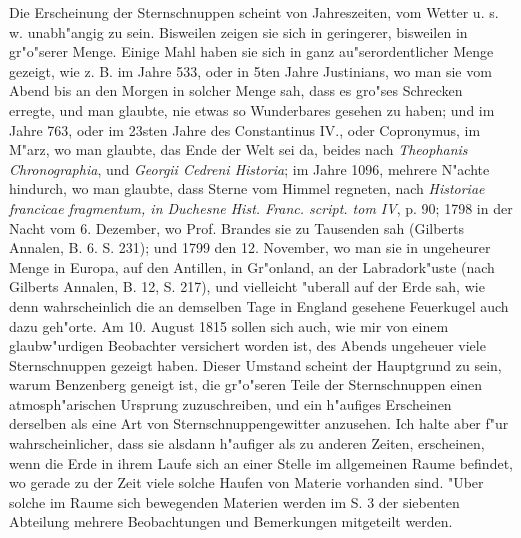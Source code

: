 \documentclass[a4paper, 11pt, oneside, polutonikogreek, german]{article}
\begin{document}
Die Erscheinung der Sternschnuppen scheint von Jahreszeiten, vom Wetter u. s. w. unabh"angig zu sein. Bisweilen zeigen sie sich in geringerer, bisweilen in gr"o"serer Menge. Einige Mahl haben sie sich in ganz au"serordentlicher Menge gezeigt, wie z. B. im Jahre 533, oder in 5ten Jahre Justinians, wo man sie vom Abend bis an den Morgen in solcher Menge sah, dass es gro"ses Schrecken erregte, und man glaubte, nie etwas so Wunderbares gesehen zu haben; und im Jahre 763, oder im 23sten Jahre des Constantinus IV., oder Copronymus, im M"arz, wo man glaubte, das Ende der Welt sei da, beides nach \emph{Theophanis Chronographia}, und \emph{Georgii Cedreni Historia}; im Jahre 1096, mehrere N"achte hindurch, wo man glaubte, dass Sterne vom Himmel regneten, nach \emph{Historiae francicae fragmentum, in Duchesne Hist. Franc. script. tom IV}, p. 90; 1798 in der Nacht vom 6. Dezember, wo Prof. Brandes sie zu Tausenden sah (Gilberts Annalen, B. 6. S. 231); und 1799 den 12. November, wo man sie in ungeheurer Menge in Europa, auf den Antillen, in Gr"onland, an der Labradork"uste (nach Gilberts Annalen, B. 12, S. 217), und vielleicht "uberall auf der Erde sah, wie denn wahrscheinlich die an demselben Tage in England gesehene Feuerkugel auch dazu geh"orte. Am 10. August 1815 sollen sich auch, wie mir von einem glaubw"urdigen Beobachter versichert worden ist, des Abends ungeheuer viele Sternschnuppen gezeigt haben. Dieser Umstand scheint der Hauptgrund zu sein, warum Benzenberg geneigt ist, die gr"o"seren Teile der Sternschnuppen einen atmosph"arischen Ursprung zuzuschreiben, und ein h"aufiges Erscheinen derselben als eine Art von Sternschnuppengewitter anzusehen. Ich halte aber f"ur wahrscheinlicher, dass sie alsdann h"aufiger als zu anderen Zeiten, erscheinen, wenn die Erde in ihrem Laufe sich an einer Stelle im allgemeinen Raume befindet, wo gerade zu der Zeit viele solche Haufen von Materie vorhanden sind. "Uber solche im Raume sich bewegenden Materien werden im S. 3 der siebenten Abteilung mehrere Beobachtungen und Bemerkungen mitgeteilt werden.
\end{document}
